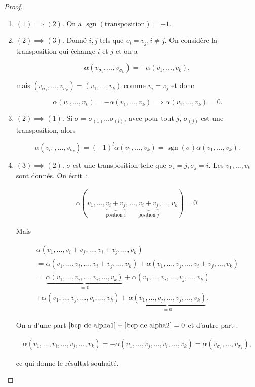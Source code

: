 \documentclass[french]{article}
\theoremstyle{definition}
\theoremstyle{remark}
\begin{document}
\begin{proof}

  \

  \begin{enumerate}
    \item \((1) \implies (2)\). On a \(\operatorname{sgn}(\text{transposition}) = -1\).
    \item \((2) \implies (3)\). Donné \(i,j\) tels que \(v_i = v_j, i \neq j\). On considère la transposition qui échange \(i\) et \(j\) et on a

    \[\alpha(v _{\sigma_1}, \dots, v _{\sigma_k}) = - \alpha(v_1, \dots, v_k), \]

    mais \((v _{\sigma_1}, \dots, v _{\sigma_k}) = (v_1, \dots, v_k)\) comme \(v_i = v_j\) et donc

    \[\alpha(v_1, \dots, v_k) = - \alpha(v_1, \dots, v_k) \implies \alpha(v_1, \dots,v_k) = 0.\]

    \item \((2) \implies (1)\). Si \(\sigma = \sigma _{(1)} \dots \sigma _{(l)}\), avec pour tout \(j\), \(\sigma _{(j)}\) est une transposition, alors

    \[\alpha(v _{\sigma_1}, \dots,v _{\sigma_k}) = (-1) ^{l}\alpha(v_1, \dots, v_k) = \operatorname{sgn}(\sigma)\alpha(v_1, \dots, v_k).\]

    \item \((3) \implies (2)\). \(\sigma\) est une transposition telle que \(\sigma_i = j, \sigma_j = i\). Les \(v_1, \dots, v_k\) sont donnés. On écrit :

    \begin{gather*}
      \alpha(v_1, \dots, \underbrace{v_i+v_j}_{\text{position }i},\dots, \underbrace{v_i+ v_j}_{\text{position }j}, \dots, v_k) = 0.
    \end{gather*}

    Mais

    \begin{gather}
      \alpha(v_1, \dots, v_i + v_j, \dots, v_i + v_j, \dots, v_k) \\
       = \alpha(v_1, \dots, v_i, \dots, v_i+v_j, \dots, v_k) + \alpha(v_1, \dots, v_j, \dots, v_i+v_j, \dots, v_k) \\
      = \underbrace{\alpha(v_1, \dots, v_i, \dots, v_i, \dots, v_k)}_{=0} + \alpha(v_1, \dots, v_i, \dots, v_j, \dots, v_k) \label{bcp-de-alpha1}\\
       + \alpha(v_1, \dots, v_j,\dots, v_i, \dots, v_k) + \underbrace{\alpha(v_1, \dots, v_j, \dots, v_j, \dots, v_k)}_{=0}. \label{bcp-de-alpha2}
    \end{gather}

    On a d'une part \(\ref{bcp-de-alpha1}+ \ref{bcp-de-alpha2} = 0\) et d'autre part :

    \begin{gather*}
      \alpha(v_1, \dots, v_i, \dots, v_j, \dots, v_k) = -\alpha(v_1, \dots, v_j, \dots, v_i, \dots, v_k) = \alpha(v _{\sigma_1}, \dots, v _{\sigma_k}),
    \end{gather*}

    ce qui donne le résultat souhaité.
  \end{enumerate}
\end{proof}
\end{document}
